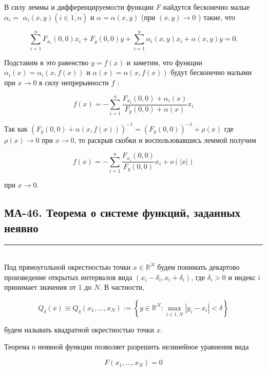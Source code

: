 \documentclass[a4paper,12pt]{article} %
\newcommand{\HRule}{\rule{\linewidth}{0.5mm}}
\begin{document}
В силу леммы и дифференцируемости функции $F$ найдутся бесконечно малые $\alpha_{i}=$ $\alpha_{i}(x, y)(i \in \overline{1, n})$ и $\alpha=\alpha(x, y)$ (при $(x, y) \rightarrow 0$ ) такие, что

$$
\sum_{i=1}^{n} F_{x_{i}}(0,0) x_{i}+F_{y}(0,0) y+\sum_{i=1}^{n} \alpha_{i}(x, y) x_{i}+\alpha(x, y) y=0 .
$$

Подставим в это равенство $y=f(x)$ и заметим, что функции $\alpha_{i}(x)=\alpha_{i}(x, f(x))$ и $\alpha(x)=\alpha(x, f(x))$ будут бесконечно малыми при $x \rightarrow 0$ в силу непрерывности $f$ :

$$
f(x)=-\sum_{i=1}^{n} \frac{F_{x_{i}}(0,0)+\alpha_{i}(x)}{F_{y}(0,0)+\alpha(x)} x_{i}
$$

Так как $\left(F_{y}(0,0)+\alpha(x, f(x))\right)^{-1}=\left(F_{y}(0,0)\right)^{-1}+\rho(x)$ где $\rho(x) \rightarrow 0$ при $x \rightarrow 0$, то раскрыв скобки и воспользовавшись леммой получим

$$
f(x)=-\sum_{i=1}^{n} \frac{F_{x_{i}}(0,0)}{F_{y}(0,0)} x_{i}+o(|x|)
$$

при $x \rightarrow 0$.





\newpage
\begin{LARGE}
\begin{center}
	\section{МА-46. Теорема о системе функций, заданных неявно }
\end{center}
\end{LARGE}
\HRule \\


Под прямоугольной окрестностью точки $x \in \mathbb{R}^{N}$ будем понимать декартово произведение открытых интервалов вида $\left(x_{i}-\delta_{i}, x_{i}+\delta_{i}\right)$, где $\delta_{i}>0$ и индекс $i$ принимает значения от 1 до $N$. В частности,

$$
Q_{\delta}(x) \equiv Q_{\delta}\left(x_{1}, \ldots, x_{N}\right):=\left\{y \in \mathbb{R}^{N}: \max _{i \in \overline{1, N}}\left|y_{i}-x_{i}\right|<\delta\right\}
$$

будем называть квадратной окрестностью точки $x$.

Теорема о неявной функции позволяет разрешить нелинейное уравнения вида

$$
F\left(x_{1}, \ldots, x_{N}\right)=0
$$
\end{document}

